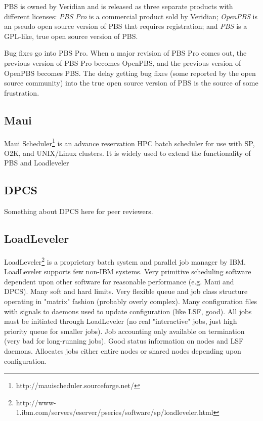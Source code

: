PBS is owned by Veridian and is released as three separate products with
different licenses: {\em PBS Pro} is a commercial product sold by Veridian;
{\em OpenPBS} is an pseudo open source version of PBS that requires 
registration; and
{\em PBS} is a GPL-like, true open source version of PBS.

Bug fixes go into PBS Pro.  When a major revision of PBS Pro comes out,
the previous version of PBS Pro becomes OpenPBS, and the previous version
of OpenPBS becomes PBS.  The delay getting bug fixes (some reported by the
open source community) into the true open source version of PBS is the source
of some frustration.

\subsection{Maui}

Maui Scheduler\footnote{http://mauischeduler.sourceforge.net/}
is an advance reservation HPC batch scheduler for use with SP, 
O2K, and UNIX/Linux clusters. It is widely used to extend the 
functionality of PBS and Loadleveler

\subsection{DPCS}

Something about DPCS here for peer reviewers.

\subsection{LoadLeveler}

LoadLeveler\footnote{
http://www-1.ibm.com/servers/eserver/pseries/software/sp/loadleveler.html}
 is a proprietary batch system and parallel job manager by 
IBM. LoadLeveler supports few non-IBM systems. Very primitive 
scheduling software dependent upon other software for reasonable 
performance (e.g. Maui and DPCS). Many soft and hard limits. Very 
flexible queue and job class structure operating in "matrix" fashion 
(probably overly complex). Many configuration files with signals to 
daemons used to update configuration (like LSF, good). All jobs must 
be initiated through LoadLeveler (no real "interactive" jobs, just 
high priority queue for smaller jobs). Job accounting only available 
on termination (very bad for long-running jobs). Good status 
information on nodes and LSF daemons. Allocates jobs either entire 
nodes or shared nodes depending upon configuration.

